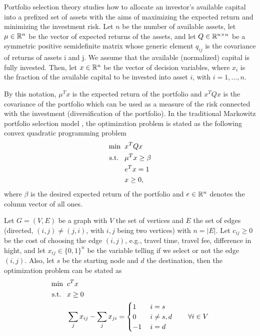 \documentclass[10pt,a4paper]{article}
\begin{document}
\begin{example} Portfolio selection theory studies how to allocate an investor’s available capital into a prefixed set of assets with the aims of maximizing the expected return and minimizing the investment risk. Let $n$ be the number of available assets, let $\mu\in \mathbb{R}^n$ be the vector of expected returns of the assets, and let $Q \in \mathbb{R}^{n\times n}$ be a symmetric positive semidefinite matrix whose generic element $q_{ij}$ is the covariance of returns of assets i and j. We assume that the available (normalized) capital is fully invested. Then, let $x \in \mathbb{R}^n$ be the vector of decision variables, where $x_i$ is the fraction of the available capital to be invested into asset $i$, with $i = 1, \dots, n$. 
\par By this notation, $\mu^T x$ is the expected return of the portfolio and $x^TQx$ is the covariance of the portfolio which
can be used as a measure of the risk connected with the investment (diversification of the portfolio). 
In the traditional Markowitz portfolio selection model \cite{markowits52a}, the optimization problem is stated as the
following convex quadratic programming problem
\begin{equation*}
	\begin{split}
		\min \;\; &x^TQx\\
		\text{s.t.} \;\;\;& \mu^Tx\geq \beta \\
		& e^Tx =1\\
		& x\geq 0,
	\end{split}
\end{equation*}
where $\beta$ is the desired expected return of the portfolio and $e\in \mathbb{R}^n$ denotes the column vector of all ones.
\end{example}
\begin{example} Let $G=(V,E)$ be a graph with $V$ the set of vertices and $E$ the set of edges (directed, $(i,j)\neq(j,i)$, with $i,j$ being two vertices) with $n=|E|$. Let $c_{ij}\geq0$ be the cost of choosing the edge $(i,j)$, e.g., travel time, travel fee, difference in hight, and let $x_{ij}\in \{0,1\}^{n}$ be the variable telling if we select or not the edge $(i,j)$. Also, let $s$ be the starting node and $d$ the destination, then the optimization problem can be stated as
\begin{equation*}
	\begin{split}
		\min \;\; &c^Tx\\
		\text{s.t.} \;\;\;& x\geq 0\\
		& \sum_{j} x_{ij} - \sum_{j} x_{ji} = \begin{cases}1 \quad & i=s\\
			0 & i\neq s,d\\
			-1 & i=d
		\end{cases} \qquad \forall i \in V
	\end{split}
\end{equation*}
\end{example}
\end{document}

